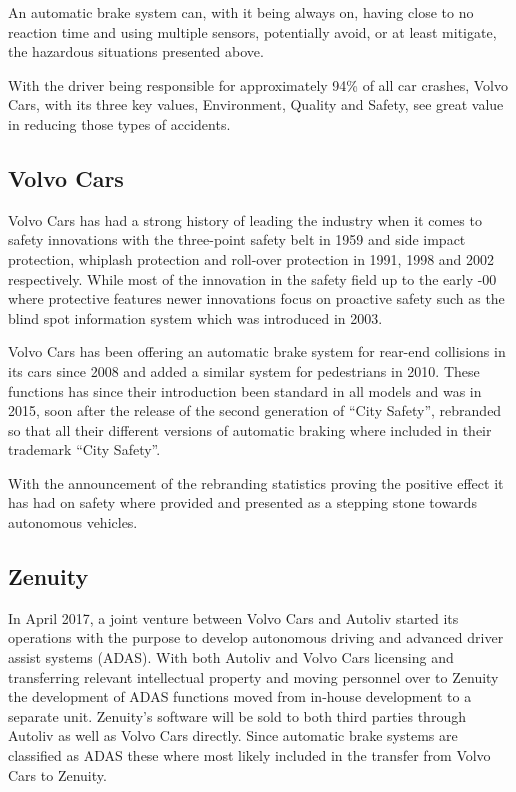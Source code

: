 \documentclass[conference]{IEEEtran}
\begin{document}
An automatic brake system can, with it being always on, having close to no reaction time and using multiple sensors, potentially avoid, or at least mitigate, the hazardous situations presented above.

With the driver being responsible for approximately 94\% of all car crashes, Volvo Cars, with its three key values, Environment, Quality and Safety, see great value in reducing those types of accidents. \cite{CrashStats,VolvoValues}

\subsection{Volvo Cars}
Volvo Cars has had a strong history of leading the industry when it comes to safety innovations with the three-point safety belt in 1959 and side impact protection, whiplash protection and roll-over protection in 1991, 1998 and 2002 respectively. 
While most of the innovation in the safety field up to the early -00 where protective features newer innovations focus on proactive safety such as the blind spot information system which was introduced in 2003. \cite{VolvoInnovation}

Volvo Cars has been offering an automatic brake system for rear-end collisions in its cars since 2008 and added a similar system for pedestrians in 2010. \cite{VolvoInnovation}
These functions has since their introduction been standard in all models and was in 2015, soon after the release of the second generation of ``City Safety'', rebranded so that all their different versions of automatic braking where included in their trademark ``City Safety''. \cite{CitySafety}

With the announcement of the rebranding statistics proving the positive effect it has had on safety where provided and presented as a stepping stone towards autonomous vehicles. \cite{CitySafety}

\subsection{Zenuity}
In April 2017, a joint venture between Volvo Cars and Autoliv started its operations with the purpose to develop autonomous driving and advanced driver assist systems (ADAS). With both Autoliv and Volvo Cars licensing and transferring relevant intellectual property and moving personnel over to Zenuity the development of ADAS functions moved from in-house development to a separate unit. Zenuity's software will be sold to both third parties through Autoliv as well as Volvo Cars directly. \cite{ZenuityLaunch} Since automatic brake systems are classified as ADAS these where most likely included in the transfer from Volvo Cars to Zenuity.
\end{document}
